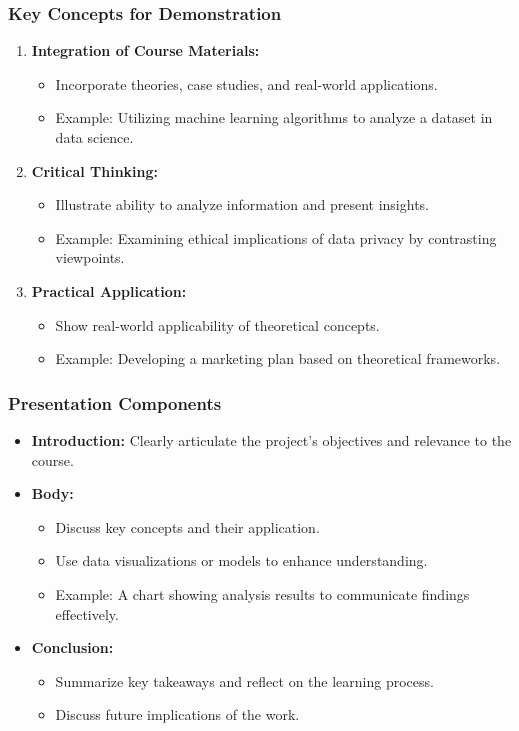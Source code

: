 \documentclass[aspectratio=169]{beamer}
\begin{document}
\begin{frame}[fragile]
    \frametitle{Key Concepts for Demonstration}
    \begin{enumerate}
        \item \textbf{Integration of Course Materials:}
        \begin{itemize}
            \item Incorporate theories, case studies, and real-world applications.
            \item Example: Utilizing machine learning algorithms to analyze a dataset in data science.
        \end{itemize}
        
        \item \textbf{Critical Thinking:}
        \begin{itemize}
            \item Illustrate ability to analyze information and present insights.
            \item Example: Examining ethical implications of data privacy by contrasting viewpoints.
        \end{itemize}
        
        \item \textbf{Practical Application:}
        \begin{itemize}
            \item Show real-world applicability of theoretical concepts.
            \item Example: Developing a marketing plan based on theoretical frameworks.
        \end{itemize}
    \end{enumerate}
\end{frame}

\begin{frame}[fragile]
    \frametitle{Presentation Components}
    \begin{itemize}
        \item \textbf{Introduction:} Clearly articulate the project’s objectives and relevance to the course.
        \item \textbf{Body:} 
        \begin{itemize}
            \item Discuss key concepts and their application.
            \item Use data visualizations or models to enhance understanding.
            \item Example: A chart showing analysis results to communicate findings effectively.
        \end{itemize}
        \item \textbf{Conclusion:} 
        \begin{itemize}
            \item Summarize key takeaways and reflect on the learning process.
            \item Discuss future implications of the work.
        \end{itemize}
    \end{itemize}
\end{frame}
\end{document}
